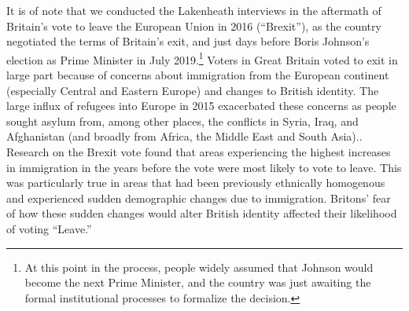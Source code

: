 

It is of note that we conducted the Lakenheath interviews in the aftermath of Britain's vote to leave the European Union in 2016 (``Brexit''), as the country negotiated the terms of Britain's exit, and just days before Boris Johnson's election as Prime Minister in July 2019.\footnote{At this point in the process, people widely assumed that Johnson would become the next Prime Minister, and the country was just awaiting the formal institutional processes to formalize the decision.} Voters in Great Britain voted to exit in large part because of concerns about immigration from the European continent (especially Central and Eastern Europe) and changes to British identity.\cite{Goodwin2016,Goodwin2017} The large influx of refugees into Europe in 2015 exacerbated these concerns as people sought asylum from, among other places, the conflicts in Syria, Iraq, and Afghanistan (and broadly from Africa, the Middle East and South Asia).\cite{Chan2015}. Research on the Brexit vote found that areas experiencing the highest increases in immigration in the years before the vote were most likely to vote to leave. This was particularly true in areas that had been previously ethnically homogenous and experienced sudden demographic changes due to immigration. Britons' fear of how these sudden changes would alter British identity affected their likelihood of voting ``Leave.''\cite{Goodwin2017}

